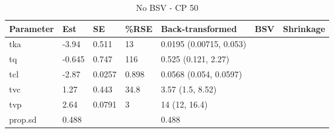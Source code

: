 \begin{table}
\centering\centering
\caption{No BSV - CP 50}
\centering
\fontsize{8}{10}\selectfont
\begin{tabular}[t]{lllllll}
\toprule
\textbf{Parameter} & \textbf{Est} & \textbf{SE} & \textbf{\%RSE} & \textbf{Back-transformed} & \textbf{BSV} & \textbf{Shrinkage}\\
\midrule
tka & -3.94 & 0.511 & 13 & 0.0195 (0.00715, 0.053) &  & \\
\midrule
tq & -0.645 & 0.747 & 116 & 0.525 (0.121, 2.27) &  & \\
\midrule
tcl & -2.87 & 0.0257 & 0.898 & 0.0568 (0.054, 0.0597) &  & \\
\midrule
tvc & 1.27 & 0.443 & 34.8 & 3.57 (1.5, 8.52) &  & \\
\midrule
tvp & 2.64 & 0.0791 & 3 & 14 (12, 16.4) &  & \\
\midrule
prop.sd & 0.488 &  &  & 0.488 &  & \\
\bottomrule
\end{tabular}
\end{table}